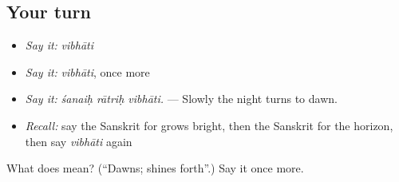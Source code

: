 \subsection*{Your turn}
\begin{itemize}
\raggedright
  \item \emph{Say it:} \emph{vibhāti}
  \item \emph{Say it:} \emph{vibhāti}, once more
  \item \emph{Say it:} \emph{śanaiḥ rātriḥ vibhāti.} — Slowly the night turns to dawn.
  \item \emph{Recall:} say the Sanskrit for grows bright, then the Sanskrit for the horizon, then say \emph{vibhāti} again
\end{itemize}

\begin{tcolorbox}[breakable,colback=teal!4,colframe=teal!35!black,title={Before you move on}]
What does  mean? (\textquotedblleft{}Dawns; shines forth\textquotedblright{}.) Say it once more.
\end{tcolorbox}
